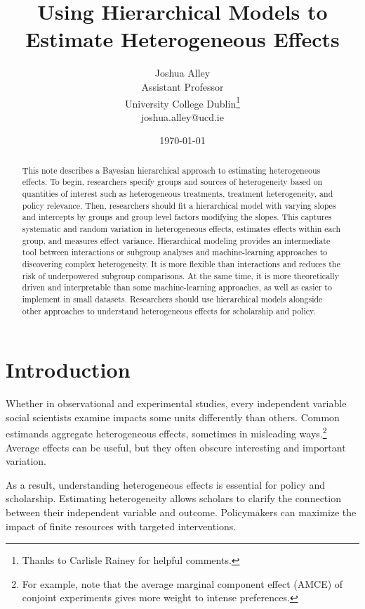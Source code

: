 \documentclass[12pt]{article}
\title{\textbf{Using Hierarchical Models to Estimate Heterogeneous Effects}}
\author{Joshua Alley \\
Assistant Professor \\
University College Dublin\thanks{Thanks to Carlisle Rainey for helpful comments.} \\
joshua.alley@ucd.ie
}
\date{\today}
\begin{document}
\maketitle 

\begin{abstract} 
This note describes a Bayesian hierarchical approach to estimating heterogeneous effects. 
To begin, researchers specify groups and sources of heterogeneity based on quantities of interest such as heterogeneous treatments, treatment heterogeneity, and policy relevance.  
Then, researchers should fit a hierarchical model with varying slopes and intercepts by groups and group level factors modifying the slopes.
This captures systematic and random variation in heterogeneous effects, estimates effects within each group, and measures effect variance. 
Hierarchical modeling provides an intermediate tool between interactions or subgroup analyses and machine-learning approaches to discovering complex heterogeneity. 
It is more flexible than interactions and reduces the risk of underpowered subgroup comparisons.
At the same time, it is more theoretically driven and interpretable than some machine-learning approaches, as well as easier to implement in small datasets. 
Researchers should use hierarchical models alongside other approaches to understand heterogeneous effects for scholarship and policy.
\end{abstract} 


\newpage 
\doublespace 


\section{Introduction}


Whether in observational and experimental studies, every independent variable social scientists examine impacts some units differently than others. 
Common estimands aggregate heterogeneous effects, sometimes in misleading ways.\footnote{For example, \citet{Abramsonetal2022} note that the average marginal component effect (AMCE) of conjoint experiments gives more weight to intense preferences.} 
Average effects can be useful, but they often obscure interesting and important variation. 


As a result, understanding heterogeneous effects is essential for policy and scholarship. 
Estimating heterogeneity allows scholars to clarify the connection between their independent variable and outcome.
Policymakers can maximize the impact of finite resources with targeted interventions. 
\end{document}
